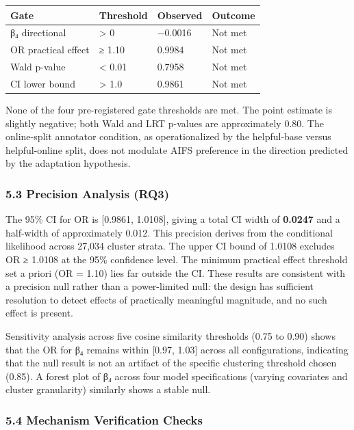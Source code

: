 \begin{table}[htbp]
\centering
\begin{tabular}{llll}
\toprule
Gate & Threshold & Observed & Outcome \\
\midrule
β₄ directional & > 0 & −0.0016 & Not met \\
OR practical effect & ≥ 1.10 & 0.9984 & Not met \\
Wald p-value & < 0.01 & 0.7958 & Not met \\
CI lower bound & > 1.0 & 0.9861 & Not met \\
\bottomrule
\end{tabular}
\end{table}

None of the four pre-registered gate thresholds are met. The point estimate is slightly negative; both Wald and LRT p-values are approximately 0.80. The online-split annotator condition, as operationalized by the helpful-base versus helpful-online split, does not modulate AIFS preference in the direction predicted by the adaptation hypothesis.

\subsubsection{5.3 Precision Analysis (RQ3)}

The 95\% CI for OR is [0.9861, 1.0108], giving a total CI width of \textbf{0.0247} and a half-width of approximately 0.012. This precision derives from the conditional likelihood across 27,034 cluster strata. The upper CI bound of 1.0108 excludes OR ≥ 1.0108 at the 95\% confidence level. The minimum practical effect threshold set a priori (OR = 1.10) lies far outside the CI. These results are consistent with a precision null rather than a power-limited null: the design has sufficient resolution to detect effects of practically meaningful magnitude, and no such effect is present.

Sensitivity analysis across five cosine similarity thresholds (0.75 to 0.90) shows that the OR for β₄ remains within [0.97, 1.03] across all configurations, indicating that the null result is not an artifact of the specific clustering threshold chosen (0.85). A forest plot of β₄ across four model specifications (varying covariates and cluster granularity) similarly shows a stable null.

\subsubsection{5.4 Mechanism Verification Checks}

